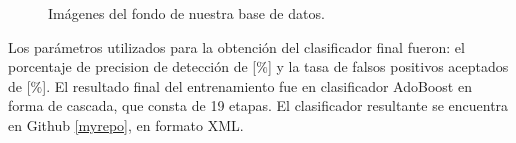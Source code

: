 \begin{figure}[h!]
\begin{center}
\quad 
{}\quad 
\end{center}
\caption{Imágenes del fondo de nuestra base de datos.}
\label{fig:ImagenFondo}
\end{figure}  

Los parámetros utilizados para la obtención del clasificador final fueron: el porcentaje de precision de detección de [$\%$] y la tasa de falsos positivos aceptados de [$\%$]. El resultado final del entrenamiento fue en clasificador AdoBoost en forma de cascada, que consta de 19 etapas. El clasificador resultante se encuentra en Github \ref{myrepo}, en formato XML.  

